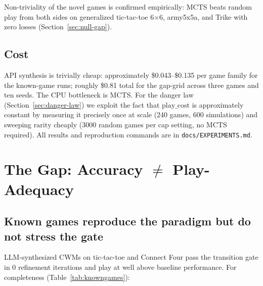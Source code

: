\documentclass[11pt]{article}
\theoremstyle{remark}
\begin{document}
Non-triviality of the novel games is confirmed empirically: MCTS beats random play from both sides on generalized tic-tac-toe 6$\times$6, army5x5a, and Trike with zero losses (Section~\ref{sec:null-gap}).

\subsection{Cost}

API synthesis is trivially cheap: approximately \$0.043--\$0.135 per game family for the known-game runs; roughly \$0.81 total for the gap-grid across three games and ten seeds. The CPU bottleneck is MCTS. For the danger law (Section~\ref{sec:danger-law}) we exploit the fact that $\mathrm{play\_cost}$ is approximately constant by measuring it precisely once at scale (240 games, 600 simulations) and sweeping $\mathrm{rarity}$ cheaply (3000 random games per cap setting, no MCTS required). All results and reproduction commands are in \texttt{docs/EXPERIMENTS.md}.

\section{The Gap: Accuracy \texorpdfstring{$\neq$}{≠} Play-Adequacy}
\label{sec:gap}

\subsection{Known games reproduce the paradigm but do not stress the gate}
\label{sec:known-games}

LLM-synthesized CWMs on tic-tac-toe and Connect Four pass the transition gate in 0 refinement iterations and play at well above baseline performance. For completeness (Table~\ref{tab:knowngames}):

\begin{table}[ht]
\centering
\small
{}
\caption{Known-game reproduction (30 games each, seed 7; CWM agent = synthesized model + MCTS; baseline = direct LLM policy).}
\label{tab:knowngames}
\end{table}
\end{document}
